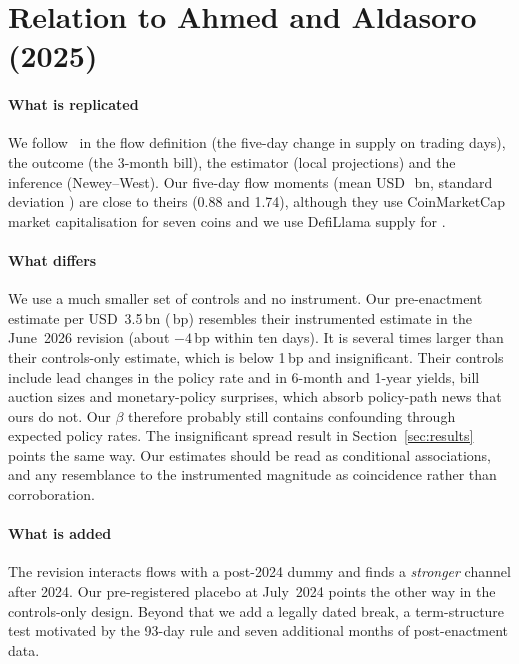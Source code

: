 \section{Relation to Ahmed and Aldasoro (2025)}\label{sec:discussion}

\paragraph*{What is replicated} We follow~\cite{ahmed2025} in the flow definition (the five-day change in supply on trading days), the outcome (the 3-month bill), the estimator (local projections) and the inference (Newey--West). Our five-day flow moments (mean USD~\flowMean{}\,bn, standard deviation \flowSD{}) are close to theirs (0.88 and 1.74), although they use CoinMarketCap market capitalisation for seven coins and we use DefiLlama supply for \nCoins{}.

\paragraph*{What differs} We use a much smaller set of controls and no instrument. Our pre-enactment estimate per USD~3.5\,bn (\bAnchorPre{}\,bp) resembles their instrumented estimate in the June~2026 revision (about $-4$\,bp within ten days). It is several times larger than their controls-only estimate, which is below 1\,bp and insignificant. Their controls include lead changes in the policy rate and in 6-month and 1-year yields, bill auction sizes and monetary-policy surprises, which absorb policy-path news that ours do not. Our $\beta$ therefore probably still contains confounding through expected policy rates. The insignificant spread result in Section~\ref{sec:results} points the same way. Our estimates should be read as conditional associations, and any resemblance to the instrumented magnitude as coincidence rather than corroboration.

\paragraph*{What is added} The revision interacts flows with a post-2024 dummy and finds a \emph{stronger} channel after 2024. Our pre-registered placebo at July~2024 points the other way in the controls-only design. Beyond that we add a legally dated break, a term-structure test motivated by the 93-day rule and seven additional months of post-enactment data.
